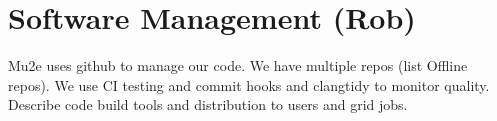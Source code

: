 \section{Software Management (Rob)}
\label{sec:codemanagement}
Mu2e uses github to manage our code.  We have multiple repos (list Offline repos).  We use CI testing and commit hooks and clangtidy to monitor quality. Describe code build tools and distribution to users and grid jobs.

